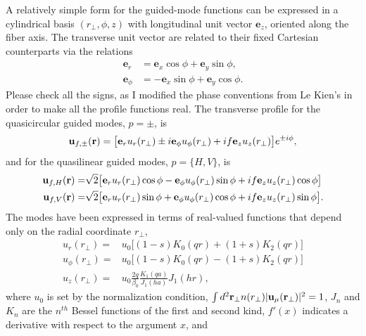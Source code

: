 \documentclass[preprint,aps,pra,onecolumn]{revtex4-1} %
\newcommand{\comment}[1]{{\color{Maroon} #1}}
\begin{document}
\begin{appendix}
A relatively simple form for the guided-mode functions can be expressed in a cylindrical basis $(r_\perp, \phi, z)$ with longitudinal unit vector $\mathbf{e}_z$, oriented along the fiber axis.  The transverse unit vector are related to their fixed Cartesian counterparts via the relations
	\begin{align}
		\mathbf{e}_r     &= \mathbf{e}_x \cos \phi + \mathbf{e}_y \sin \phi, \\
		\mathbf{e}_\phi &= - \mathbf{e}_x \sin \phi + \mathbf{e}_y \cos \phi.
	\end{align}
\comment{Please check all the signs, as I modified the phase conventions from Le Kien's in order to make all the profile functions real.}  The transverse profile for the quasicircular guided modes, $p = \pm$, is
	\begin{align} \label{Eq::QuasicircularModes}
		\mathbf{u}_{f,\pm}(\mathbf{r}) = \big[\mathbf{e}_r u_r(r_\perp) \pm i \mathbf{e}_\phi u_\phi(r_\perp) +  i f \mathbf{e}_z  u_z(r_\perp) \big]e^{ \pm i \phi}, 
	\end{align}
and for the quasilinear guided modes, $p = \{H,V\}$, is
	\begin{subequations} \label{Eq::QuasilinearModes}
	\begin{align}
		\mathbf{u}_{f,H}(\mathbf{r}) = & \sqrt{2} \big[ \mathbf{e}_r u_r(r_\perp) \cos \phi - \mathbf{e}_\phi u_\phi(r_\perp) \sin \phi +  if \mathbf{e}_z  u_z(r_\perp) \cos \phi \big] \\
		\mathbf{u}_{f,V}(\mathbf{r}) = & \sqrt{2} \big[ \mathbf{e}_r u_r(r_\perp) \sin \phi + \mathbf{e}_\phi u_\phi(r_\perp) \cos \phi +  if \mathbf{e}_z  u_z(r_\perp) \sin \phi \big]. 
	\end{align}
	\end{subequations}
The modes have been expressed in terms of real-valued functions that depend only on the radial coordinate $r_\perp$,
	\begin{subequations} \label{Eq::ProfileFunctions}
	\begin{align} 
		u_r(r_\perp) =& u_0 \big[ (1-s) K_0(qr) + (1+s)K_2(qr)\big] \\
		u_\phi(r_\perp) =& u_0\big[ (1-s) K_0(qr) - (1+s)K_2(qr)\big] \\
		u_z(r_\perp) =& u_0 \frac{2 q}{\beta_0} \frac{K_1(qa)}{J_1(ha)} J_1(hr), \label{Eq::zprofile}
	\end{align}
	\end{subequations}
where $u_0$ is set by the normalization condition, $\int d^2 \mathbf{r}_\perp n(r_\perp) | \mathbf{u}_\mu(\mathbf{r}_\perp)|^2=1$, $J_n$ and $K_n$ are the $n^{th}$ Bessel functions of the first and second kind, $f'(x)$ indicates a derivative with respect to the argument $x$, and 

\end{appendix}
\end{document}
